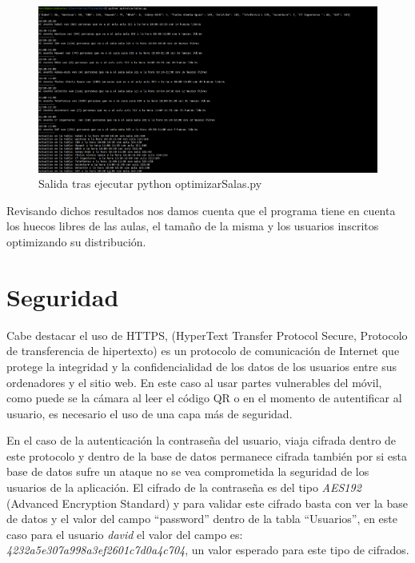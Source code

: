 \documentclass[a4paper, 12pt]{book}
\begin{document}
 \begin{figure}[h!]
  	\centering
  	\includegraphics[width=16cm, keepaspectratio]{img/terminalOptimizar.png}
  	\caption{Salida tras ejecutar python optimizarSalas.py}\label{fig:terminalOptimizar}
	\end{figure}
 
Revisando dichos resultados nos damos cuenta que el programa tiene en cuenta los huecos libres de las aulas, el tamaño de la misma y los usuarios inscritos optimizando su distribución.


\section{Seguridad}
Cabe destacar el uso de HTTPS, (HyperText Transfer Protocol Secure, Protocolo de transferencia de hipertexto) es un protocolo de comunicación de Internet que protege la integridad y la confidencialidad de los datos de los usuarios entre sus ordenadores y el sitio web. En este caso al usar partes vulnerables del móvil, como puede se la cámara al leer el código QR o en el momento de autentificar al usuario, es necesario el uso de una capa más de seguridad.
 
 
En el caso de la autenticación la contraseña del usuario, viaja cifrada dentro de este protocolo y dentro de la base de datos permanece cifrada también por si esta base de datos sufre un ataque no se vea comprometida la seguridad de los usuarios de la aplicación.
El cifrado de la contraseña es del tipo \textit{AES192} (Advanced Encryption Standard) y para validar este cifrado basta con ver la base de datos y el valor del campo ``password'' dentro de la tabla ``Usuarios'', en este caso para el usuario \textit{david} el valor del campo es: \textit{4232a5e307a998a3ef2601c7d0a4c704}, un valor esperado para este tipo de cifrados.



\end{document}
